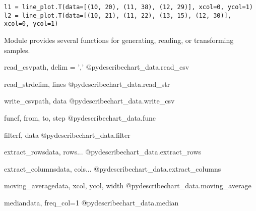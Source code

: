 \documentclass{howto}
\begin{document}
\begin{verbatim}
l1 = line_plot.T(data=[(10, 20), (11, 38), (12, 29)], xcol=0, ycol=1)
l2 = line_plot.T(data=[(10, 21), (11, 22), (13, 15), (12, 30)], xcol=0, ycol=1)
\end{verbatim}


Module  provides several functions for generating,
reading, or transforming samples.


\begin{funcdesc}{read_csv}{path, delim = ','}
@pydescribe{chart_data.read_csv}
\end{funcdesc}

\begin{funcdesc}{read_str}{delim, lines}
@pydescribe{chart_data.read_str}
\end{funcdesc}

\begin{funcdesc}{write_csv}{path, data}
@pydescribe{chart_data.write_csv}
\end{funcdesc}

\begin{funcdesc}{func}{f, from, to, step}
@pydescribe{chart_data.func}
\end{funcdesc}

\begin{funcdesc}{filter}{f, data}
@pydescribe{chart_data.filter}
\end{funcdesc}

\begin{funcdesc}{extract_rows}{data, rows...}
@pydescribe{chart_data.extract_rows}
\end{funcdesc}

\begin{funcdesc}{extract_columns}{data, cols...}
@pydescribe{chart_data.extract_columns}
\end{funcdesc}

\begin{funcdesc}{moving_average}{data, xcol, ycol, width}
@pydescribe{chart_data.moving_average}
\end{funcdesc}

\begin{funcdesc}{median}{data, freq_col=1}
@pydescribe{chart_data.median}
\end{funcdesc}
\end{document}
